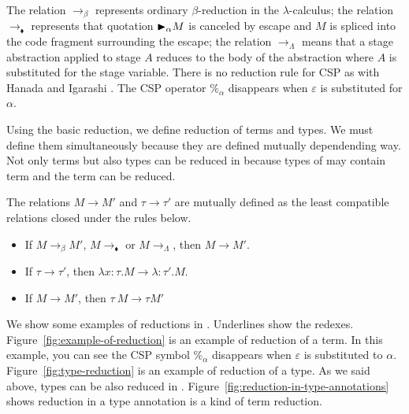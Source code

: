 The relation $\longrightarrow_\beta$ represents ordinary $\beta$-reduction in
the \(\lambda\)-calculus; the relation $\longrightarrow_\blacklozenge$
represents that quotation ${\mathop{\blacktriangleright}}_\alpha M$ is canceled by escape and $M$ is
spliced into the code fragment surrounding the escape; the relation
$\longrightarrow_\Lambda$ means that a stage abstraction applied to stage $A$
reduces to the body of the abstraction where $A$ is substituted for the stage
variable. There is no reduction rule for CSP as with Hanada and Igarashi
\cite{HanadaIgarashi2014CSP}. The CSP operator $\%_\alpha$ disappears when $\varepsilon$
is substituted for $\alpha$.

Using the basic reduction, we define reduction of terms and types. We must
define them simultaneously because they are defined mutually dependending way.
Not only terms but also types can be reduced in \LMD because types of \LMD may
contain term and the term can be reduced.  

\begin{definition}
    The relations \( M \longrightarrow M' \) and \( \tau \longrightarrow \tau'
    \) are mutually defined as the least compatible relations closed under the
    rules below.
    \begin{itemize}
        \item If \( M \longrightarrow_{\beta} M' \), \( M \longrightarrow_\blacklozenge \) or \( M \longrightarrow_\Lambda \), then \( M \longrightarrow M' \). \\
        \item If \( \tau \longrightarrow \tau' \), then \( \lambda x:\tau.M \longrightarrow \lambda:\tau'.M \). \\
        \item If \( M \longrightarrow M' \), then \( \tau\ M \longrightarrow \tau M' \)
    \end{itemize}
\end{definition}

We show some examples of reductions in \LMD. Underlines show the redexes. Figure~\ref{fig:example-of-reduction} is an example of reduction of a term. In this example, you can see the CSP symbol \( \%_\alpha \) disappears when \( \varepsilon \) is substituted to \( \alpha \). Figure~\ref{fig:type-reduction} is an example of reduction of a type. As we said above, types can be also reduced in \LMD. Figure~\ref{fig:reduction-in-type-annotations} shows reduction in a type annotation is a kind of term reduction.


